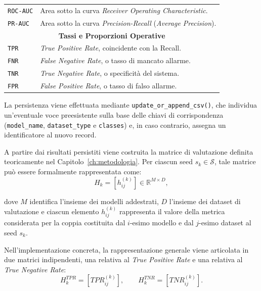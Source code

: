 \begin{table}[H]
\begin{tabularx}{\textwidth}{l >{\raggedright\arraybackslash}X}
        \texttt{ROC-AUC} & Area sotto la curva \textit{Receiver Operating Characteristic}. \\
        \texttt{PR-AUC} & Area sotto la curva \textit{Precision-Recall} (\textit{Average Precision}). \\
        \hline
        \multicolumn{2}{c}{\textbf{Tassi e Proporzioni Operative}} \\
        \hline
        \texttt{TPR} & \textit{True Positive Rate}, coincidente con la Recall. \\
        \texttt{FNR} & \textit{False Negative Rate}, o tasso di mancato allarme. \\
        \texttt{TNR} & \textit{True Negative Rate}, o specificità del sistema. \\
        \texttt{FPR} & \textit{False Positive Rate}, o tasso di falso allarme. \\
        \bottomrule
    \end{tabularx}
\end{table}

La persistenza viene effettuata mediante \texttt{update\_or\_append\_csv()}, che individua un'eventuale voce preesistente sulla base delle chiavi di corrispondenza (\texttt{model\_name}, \texttt{dataset\_type} e \texttt{classes}) e, in caso contrario, assegna un identificatore al nuovo record. 

A partire dai risultati persistiti viene costruita la matrice di valutazione definita teoricamente nel Capitolo~\ref{ch:metodologia}. 
Per ciascun seed $s_k \in \mathcal{S}$, tale matrice può essere formalmente rappresentata come:
\begin{equation}
H_k = \left[ h_{ij}^{(k)} \right] \in \mathbb{R}^{M \times D},
\label{eq:hk_implementation}
\end{equation}

dove $M$ identifica l'insieme dei modelli addestrati, $D$ l'insieme dei dataset di valutazione e ciascun elemento $h_{ij}^{(k)}$ rappresenta il valore della metrica considerata per la coppia costituita dal $i$-esimo modello e dal $j$-esimo dataset al seed $s_k$.

Nell'implementazione concreta, la rappresentazione generale viene articolata in due matrici indipendenti, una relativa al \textit{True Positive Rate} e una relativa al \textit{True Negative Rate}:
\begin{equation}
H_k^{TPR} = \left[ TPR_{ij}^{(k)} \right], \qquad H_k^{TNR} = \left[ TNR_{ij}^{(k)} \right].
\label{eq:hk_tpr_tnr}
\end{equation}

